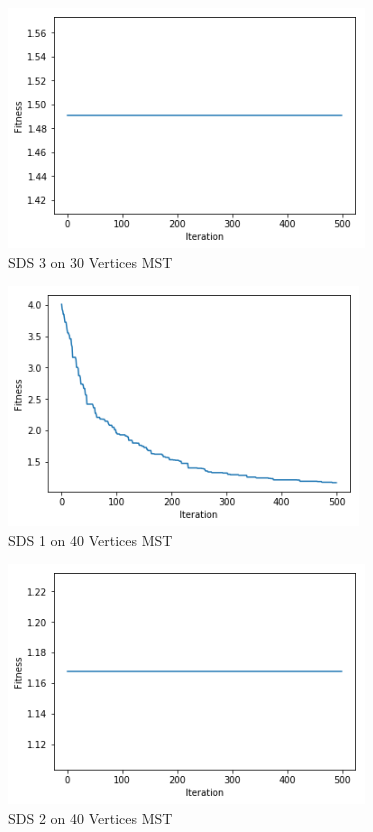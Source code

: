 \documentclass{AISB2008}
\begin{document}
{\begin{figure}
\centerline{\includegraphics[height=2.5in]{30MSTA3.png}}
\caption{SDS 3 on 30 Vertices MST}
\end{figure}


\begin{figure}
\centerline{\includegraphics[height=2.5in]{40MSTA1.png}}
\caption{SDS 1 on 40 Vertices MST}
\end{figure}

\begin{figure}
\centerline{\includegraphics[height=2.5in]{40MSTA2.png}}
\caption{SDS 2 on 40 Vertices MST}
\end{figure}

}
\end{document}
